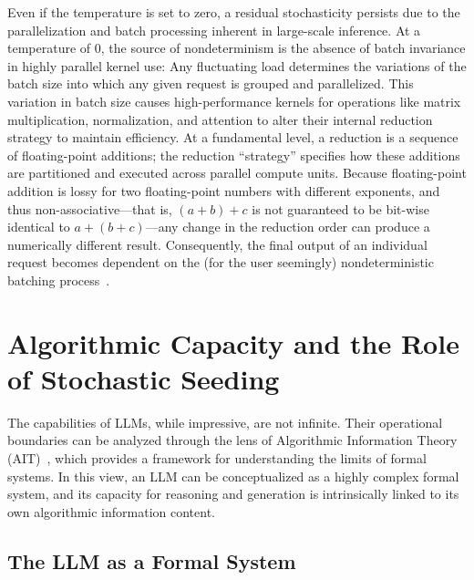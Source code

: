 \documentclass[%
  reprint,
  superscriptaddress,
  showpacs,
  showkeys,
  amsmath,amssymb,
  pra,
  longbibliography,
  floatfix,
  x11names
]{revtex4-2}
\begin{document}
Even if the temperature is set to zero, a residual stochasticity persists due to the parallelization and batch processing inherent in large-scale inference. At a temperature of 0, the source of nondeterminism is the absence of batch invariance in highly parallel kernel use:
Any fluctuating load determines the variations of the batch size into which any given request is grouped and parallelized.
 This variation in batch size causes high-performance kernels for operations like matrix multiplication, normalization,
 and attention to alter their internal reduction strategy to maintain efficiency.
At a fundamental level, a reduction is a sequence of floating-point additions; the reduction ``strategy''
specifies how these additions are partitioned and executed across parallel compute units.
Because floating-point addition is lossy for two floating-point numbers with different exponents,
and thus non-associative---that is, \((a + b) + c\) is not guaranteed to be bit-wise identical to \(a + (b + c)\)---any change in the reduction order can produce a numerically different result. Consequently, the final output of an individual request becomes dependent on the (for the user seemingly) nondeterministic batching process~\cite{he2025nondeterminism}.

\section{Algorithmic Capacity and the Role of Stochastic Seeding}

The capabilities of LLMs, while impressive, are not infinite.
Their operational boundaries can be analyzed through the lens of Algorithmic Information Theory (AIT)~\cite{chaitin3,calude:02},
which provides a framework for understanding the limits of formal systems.
In this view, an LLM can be conceptualized as a highly complex formal system,
and its capacity for reasoning and generation is intrinsically linked to its own algorithmic information content.

\subsection{The LLM as a Formal System}
\end{document}
